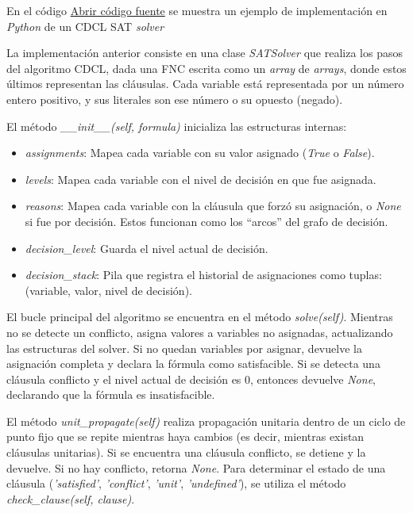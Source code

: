 En el c\'odigo \href{Graphics/dpll\_cdcl\_sat\_solver.py}{Abrir c\'odigo fuente} se muestra un ejemplo de implementación en \textit{Python} de un CDCL SAT \textit{solver}

La implementación anterior consiste en una clase \textit{SATSolver} que realiza los pasos del algoritmo CDCL, dada una FNC escrita como un \textit{array} de \textit{arrays}, donde estos últimos representan las cláusulas. Cada variable está representada por un número entero positivo, y sus literales son ese número o su opuesto (negado).

El método \textit{\_\_init\_\_(self, formula)} inicializa las estructuras internas:
\begin{itemize}
  \item \textit{assignments}: Mapea cada variable con su valor asignado (\textit{True} o \textit{False}).
  \item \textit{levels}: Mapea cada variable con el nivel de decisión en que fue asignada.
  \item \textit{reasons}: Mapea cada variable con la cláusula que forzó su asignación, o \textit{None} si fue por decisión. Estos funcionan como los ``arcos'' del grafo de decisión.
  \item \textit{decision\_level}: Guarda el nivel actual de decisión.
  \item \textit{decision\_stack}: Pila que registra el historial de asignaciones como tuplas: (variable, valor, nivel de decisión).
\end{itemize}

El bucle principal del algoritmo se encuentra en el método \textit{solve(self)}. Mientras no se detecte un conflicto, asigna valores a variables no asignadas, actualizando las estructuras del solver. Si no quedan variables por asignar, devuelve la asignación completa y declara la fórmula como satisfacible. Si se detecta una cláusula conflicto y el nivel actual de decisión es 0, entonces devuelve \textit{None}, declarando que la fórmula es insatisfacible. 

El método \textit{unit\_propagate(self)} realiza propagación unitaria dentro de un ciclo de punto fijo que se repite mientras haya cambios (es decir, mientras existan cláusulas unitarias). Si se encuentra una cláusula conflicto, se detiene y la devuelve. Si no hay conflicto, retorna \textit{None}. Para determinar el estado de una cláusula (\textit{'satisfied'}, \textit{'conflict'}, \textit{'unit'}, \textit{'undefined'}), se utiliza el método \textit{check\_clause(self, clause)}.

